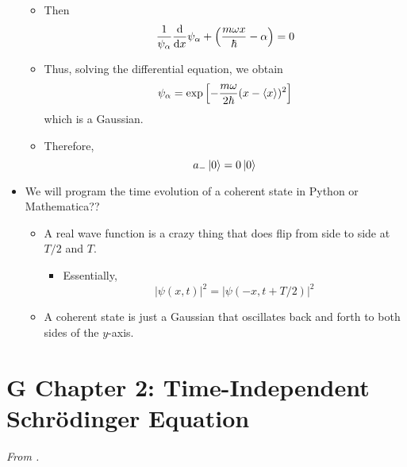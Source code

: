 \documentclass[../notes.tex]{subfiles}
\begin{document}
\begin{itemize}
    \begin{itemize}
        \item Then
        \begin{equation*}
            \frac{1}{\psi_\alpha}\dv{x}\psi_\alpha+\left( \frac{m\omega x}{\hbar}-\alpha \right) = 0
        \end{equation*}
        \item Thus, solving the differential equation, we obtain
        \begin{equation*}
            \psi_\alpha = \exp\left[ -\frac{m\omega}{2\hbar}(x-\langle{x}\rangle)^2 \right]
        \end{equation*}
        which is a Gaussian.
        \item Therefore,
        \begin{equation*}
            a_-\ket{0} = 0\ket{0}
        \end{equation*}
    \end{itemize}
    \item We will program the time evolution of a coherent state in Python or Mathematica??
    \begin{itemize}
        \item A real wave function is a crazy thing that does flip from side to side at $T/2$ and $T$.
        \begin{itemize}
            \item Essentially,
            \begin{equation*}
                |\psi(x,t)|^2 = |\psi(-x,t+T/2)|^2
            \end{equation*}
        \end{itemize}
        \item A coherent state is just a Gaussian that oscillates back and forth to both sides of the $y$-axis.
    \end{itemize}
\end{itemize}



\section{G Chapter 2: Time-Independent Schr\"{o}dinger Equation}
\emph{From \textcite{bib:Griffiths}.}
\end{document}
